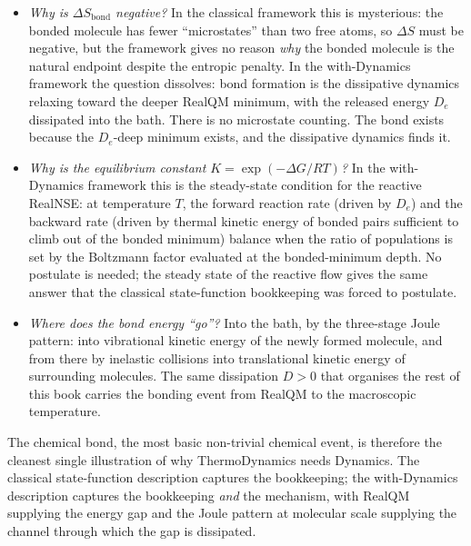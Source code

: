 \begin{itemize}
\item \emph{Why is $\Delta S_{\mathrm{bond}}$ negative?} In the classical
framework this is mysterious: the bonded molecule has fewer ``microstates''
than two free atoms, so $\Delta S$ must be negative, but the framework
gives no reason \emph{why} the bonded molecule is the natural endpoint
despite the entropic penalty. In the with-Dynamics framework the question
dissolves: bond formation is the dissipative dynamics relaxing toward the
deeper RealQM minimum, with the released energy $D_e$ dissipated into the
bath. There is no microstate counting. The bond exists because the
$D_e$-deep minimum exists, and the dissipative dynamics finds it.

\item \emph{Why is the equilibrium constant $K = \exp(-\Delta G/RT)$?} In
the with-Dynamics framework this is the steady-state condition for the
reactive RealNSE: at temperature $T$, the forward reaction rate (driven by
$D_e$) and the backward rate (driven by thermal kinetic energy of bonded
pairs sufficient to climb out of the bonded minimum) balance when the
ratio of populations is set by the Boltzmann factor evaluated at the
bonded-minimum depth. No postulate is needed; the steady state of the
reactive flow gives the same answer that the classical state-function
bookkeeping was forced to postulate.

\item \emph{Where does the bond energy ``go''?} Into the bath, by the
three-stage Joule pattern: into vibrational kinetic energy of the newly
formed molecule, and from there by inelastic collisions into translational
kinetic energy of surrounding molecules. The same dissipation $D > 0$
that organises the rest of this book carries the bonding event from RealQM
to the macroscopic temperature.
\end{itemize}

The chemical bond, the most basic non-trivial chemical event, is therefore
the cleanest single illustration of why ThermoDynamics needs Dynamics. The
classical state-function description captures the bookkeeping; the
with-Dynamics description captures the bookkeeping \emph{and} the
mechanism, with RealQM supplying the energy gap and the Joule pattern at
molecular scale supplying the channel through which the gap is dissipated.
